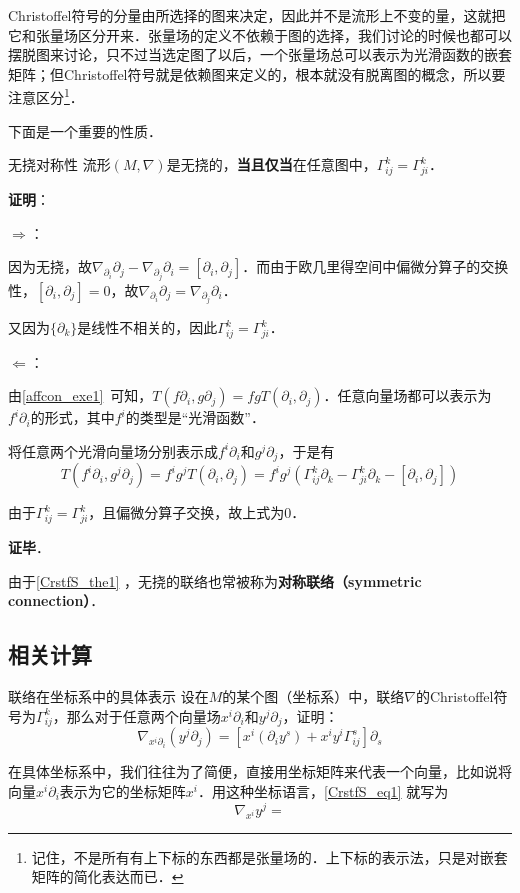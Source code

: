 Christoffel符号的分量由所选择的图来决定，因此并不是流形上不变的量，这就把它和张量场区分开来．张量场的定义不依赖于图的选择，我们讨论的时候也都可以摆脱图来讨论，只不过当选定图了以后，一个张量场总可以表示为光滑函数的嵌套矩阵；但Christoffel符号就是依赖图来定义的，根本就没有脱离图的概念，所以要注意区分\footnote{记住，不是所有有上下标的东西都是张量场的．上下标的表示法，只是对嵌套矩阵的简化表达而已．}．


下面是一个重要的性质．

\begin{theorem}{无挠对称性}\label{CrstfS_the1}
流形$(M, \nabla)$是无挠的，\textbf{当且仅当}在任意图中，$\Gamma^k_{ij}=\Gamma^k_{ji}$．
\end{theorem}

\textbf{证明}：

$\Rightarrow$：

因为无挠，故$\nabla_{\partial_i}\partial_j-\nabla_{\partial_j}\partial_i=[\partial_i, \partial_j]$．而由于欧几里得空间中偏微分算子的交换性，$[\partial_i, \partial_j]=0$，故$\nabla_{\partial_i}\partial_j=\nabla_{\partial_j}\partial_i$．

又因为$\{\partial_k\}$是线性不相关的，因此$\Gamma^k_{ij}=\Gamma^k_{ji}$．

$\Leftarrow$：

由\autoref{affcon_exe1}~可知，$T(f\partial_i, g\partial_j)=fgT(\partial_i, \partial_j)$．任意向量场都可以表示为$f^i\partial_i$的形式，其中$f^i$的类型是“光滑函数”．

将任意两个光滑向量场分别表示成$f^i\partial_i$和$g^j\partial_j$，于是有
\begin{equation}
T(f^i\partial_i, g^j\partial_j)=f^ig^jT(\partial_i, \partial_j)=f^ig^j(\Gamma^k_{ij}\partial_k-\Gamma^k_{ji}\partial_k-[\partial_i, \partial_j])
\end{equation}

由于$\Gamma^k_{ij}=\Gamma^k_{ji}$，且偏微分算子交换，故上式为$0$．

\textbf{证毕}．

由于\autoref{CrstfS_the1} ，无挠的联络也常被称为\textbf{对称联络（symmetric connection）}．


\subsection{相关计算}

\begin{exercise}{联络在坐标系中的具体表示}
设在$M$的某个图（坐标系）中，联络$\nabla$的Christoffel符号为$\Gamma^k_{ij}$，那么对于任意两个向量场$x^i\partial_i$和$y^j\partial_j$，证明：
\begin{equation}\label{CrstfS_eq1}
\nabla_{x^i\partial_i}(y^j\partial_j)=[x^i(\partial_iy^s)+x^iy^i\Gamma^s_{ij}]\partial_s
\end{equation}
\end{exercise}

在具体坐标系中，我们往往为了简便，直接用坐标矩阵来代表一个向量，比如说将向量$x^i\partial_i$表示为它的坐标矩阵$x^i$．用这种坐标语言，\autoref{CrstfS_eq1} 就写为
\begin{equation}
\nabla_{x^i}y^j=
\end{equation}










